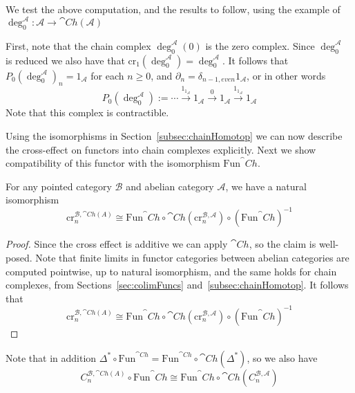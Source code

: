 We test the above computation, and the results to follow, using the example of $\deg_0^\mathcal{A}:\mathcal{A}\rightarrow \cat{Ch}(\mathcal{A})$

\begin{eg}{}
    First, note that the chain complex $\deg_0^\mathcal{A}(0)$ is the zero complex. Since $\deg_0^\mathcal{A}$ is reduced we also have that $\text{cr}_1(\deg_0^\mathcal{A}) = \deg_0^\mathcal{A}$. It follows that $P_0(\deg_0^\mathcal{A})_n = 1_\mathcal{A}$ for each $n \geq 0$, and $\partial_n = \delta_{n-1,even}1_{\mathcal{A}}$, or in other words
    \begin{equation*}
        P_0(\deg_0^\mathcal{A}) := \cdots \xrightarrow{1_{1_\mathcal{A}}} 1_\mathcal{A}\xrightarrow{0} 1_\mathcal{A}\xrightarrow{1_{1_\mathcal{A}}} 1_\mathcal{A}
    \end{equation*}
    Note that this complex is contractible.
\end{eg}

Using the isomorphisms in Section~\ref{subsec:chainHomotop} we can now describe the cross-effect on functors into chain complexes explicitly. Next we show compatibility of this functor with the isomorphism $\text{Fun}^\cat{Ch}$.

\begin{lem}[label=lem:ChFuncCommute]
    For any pointed category $\mathcal{B}$ and abelian category $\mathcal{A}$, we have a natural isomorphism
    \begin{equation*}
        \text{cr}_n^{\mathcal{B},\cat{Ch}(A)} \cong \text{Fun}^\cat{Ch}\circ \cat{Ch}(\text{cr}_n^{\mathcal{B},\mathcal{A}})\circ (\text{Fun}^\cat{Ch})^{-1}
    \end{equation*}
\end{lem}
\begin{proof}
    Since the cross effect is additive we can apply $\cat{Ch}$, so the claim is well-posed. Note that finite limits in functor categories between abelian categories are computed pointwise, up to natural isomorphism, and the same holds for chain complexes, from Sections~\ref{sec:colimFuncs} and~\ref{subsec:chainHomotop}. It follows that 
    \begin{equation*}
        \text{cr}_n^{\mathcal{B},\cat{Ch}(A)} \cong \text{Fun}^\cat{Ch}\circ \cat{Ch}(\text{cr}_n^{\mathcal{B},\mathcal{A}})\circ (\text{Fun}^\cat{Ch})^{-1}
    \end{equation*}
\end{proof}

Note that in addition $\Delta^*\circ \text{Fun}^{\cat{Ch}} = \text{Fun}^{\cat{Ch}}\circ \cat{Ch}(\Delta^*)$, so we also have 
\begin{equation*}
    C_n^{\mathcal{B},\cat{Ch}(A)}\circ \text{Fun}^\cat{Ch} \cong \text{Fun}^\cat{Ch}\circ \cat{Ch}(C_n^{\mathcal{B},\mathcal{A}})
\end{equation*}

